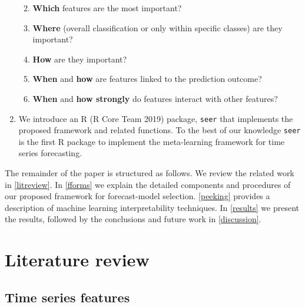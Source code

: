 \documentclass[11pt,a4paper,]{article}
\providecommand{\tightlist}{%
  \setlength{\itemsep}{0pt}\setlength{\parskip}{0pt}}
\begin{document}
\begin{enumerate}
  \begin{enumerate}
  \def\labelenumii{\roman{enumii})}
  \tightlist
  \item
    \textbf{Which} features are the most important?
  \item
    \textbf{Where} (overall classification or only within specific classes) are they important?
  \item
    \textbf{How} are they important?
  \item
    \textbf{When} and \textbf{how} are features linked to the prediction outcome?
  \item
    \textbf{When} and \textbf{how strongly} do features interact with other features?
  \end{enumerate}
\item
  We introduce an R (R Core Team 2019) package, \texttt{seer} \autocite{seer} that implements the proposed framework and related functions. To the best of our knowledge \texttt{seer} is the first R package to implement the meta-learning framework for time series forecasting.
\end{enumerate}

The remainder of the paper is structured as follows. We review the related work in \autoref{litreview}. In \autoref{fforms} we explain the detailed components and procedures of our proposed framework for forecast-model selection. \autoref{peeking} provides a description of machine learning interpretability techniques. In \autoref{results} we present the results, followed by the conclusions and future work in \autoref{discussion}.

\hypertarget{litreview}{%
\section{Literature review}\label{litreview}}

\hypertarget{time-series-features}{%
\subsection{Time series features}\label{time-series-features}}
\end{document}
